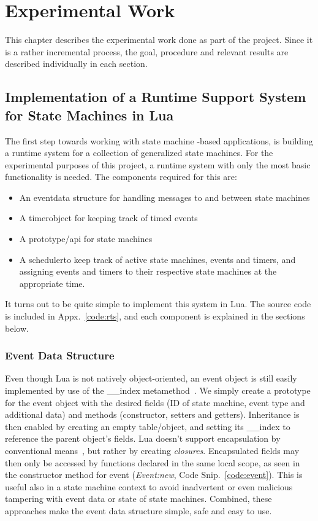 \chapter{Experimental Work}
\label{ch:experimental_work}
This chapter describes the experimental work done as part of the project. Since it is a rather incremental process, the goal, procedure and relevant results are described individually in each section.

\section{Implementation of a Runtime Support System for State Machines in Lua}
\label{sec:impl_runtime_support}
The first step towards working with state machine -based applications, is building a runtime system for a collection of generalized state machines. For the experimental purposes of this project, a runtime system with only the most basic functionality is needed. The components required for this are:

\begin{itemize}
	\item An \guillemotleft event\guillemotright data structure for handling messages to and between state machines
	\item A \guillemotleft timer\guillemotright object for keeping track of timed events
	\item A prototype/\gls{api} for state machines
	\item A \guillemotleft scheduler\guillemotright to keep track of active state machines, events and timers, and assigning events and timers to their respective state machines at the appropriate time.
\end{itemize}

It turns out to be quite simple to implement this system in Lua. The source code is included in Appx.~\ref{code:rts}, and each component is explained in the sections below.

\subsection{Event Data Structure}
\label{sec:impl_event}
Even though Lua is not natively object-oriented, an event object is still easily implemented by use of the \_\_index metamethod~\cite[13.4.1]{book:programming_in_lua_first}. We simply create a prototype for the event object with the desired fields (ID of state machine, event type and additional data) and methods (constructor, setters and getters). Inheritance is then enabled by creating an empty table/object, and setting its \_\_index to reference the parent object's fields. Lua doesn't support encapsulation by conventional means~\cite[16.4]{book:programming_in_lua_first}, but rather by creating \emph{closures}. Encapsulated fields may then only be accessed by functions declared in the same local scope, as seen in the constructor method for event (\emph{Event:new}, Code Snip.~\ref{code:event}). This is useful also in a state machine context to avoid inadvertent or even malicious tampering with event data or state of state machines. Combined, these approaches make the event data structure simple, safe and easy to use.


